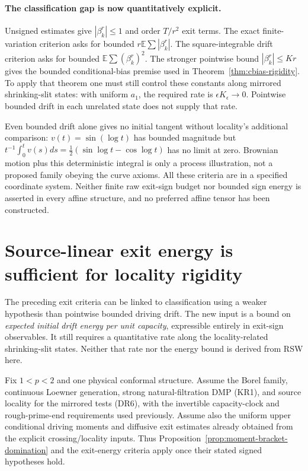 \documentclass[11pt]{article}
\theoremstyle{definition}\newtheorem{definition}[theorem]{Definition}
\theoremstyle{remark}\newtheorem{remark}[theorem]{Remark}
\begin{document}
\paragraph{The classification gap is now quantitatively explicit.}
Unsigned estimates give $|\beta^r_k|\le1$ and order $T/r^2$ exit
terms. The exact finite-variation criterion asks for bounded
$r\mathbb E\sum|\beta^r_k|$. The square-integrable drift criterion
asks for bounded $\mathbb E\sum(\beta^r_k)^2$. The stronger pointwise
bound $|\beta^r_k|\le Kr$ gives the bounded conditional-bias premise
used in Theorem~\ref{thm:cbias-rigidity}. To apply that theorem one must
still control these constants along mirrored shrinking-slit states:
with uniform $a_1$, the required rate is
$\epsilon K_\epsilon\to0$. Pointwise bounded drift in each unrelated
state does not supply that rate.

Even bounded drift alone gives no initial tangent without locality's
additional comparison: $v(t)=\sin(\log t)$ has bounded magnitude but
$t^{-1}\int_0^t v(s)ds=\tfrac12(\sin\log t-\cos\log t)$ has no limit
at zero. Brownian motion plus this deterministic integral is only a
process illustration, not a proposed family obeying the curve axioms.
All these criteria are in a specified coordinate system. Neither finite
raw exit-sign budget nor bounded sign energy is asserted in every affine
structure, and no preferred affine tensor has been constructed.


\section{Source-linear exit energy is sufficient for locality rigidity}
\label{sec:exit-energy-rigidity}

The preceding exit criteria can be linked to classification using a
weaker hypothesis than pointwise bounded driving drift.  The new input
is a bound on \emph{expected initial drift energy per unit capacity},
expressible entirely in exit-sign observables.  It still requires a
quantitative rate along the locality-related shrinking-slit states.
Neither that rate nor the energy bound is derived from RSW here.

Fix $1<p<2$ and one physical conformal structure. Assume the Borel family,
continuous Loewner generation, strong natural-filtration DMP (KR1), and
source locality for the mirrored tests (DR6), with the invertible
capacity-clock and rough-prime-end requirements used previously. Assume
also the uniform upper conditional driving moments and diffusive exit
estimates already obtained from the explicit crossing/locality inputs.
Thus Proposition~\ref{prop:moment-bracket-domination} and the exit-energy
criteria apply once their stated signed hypotheses hold.
\end{document}
